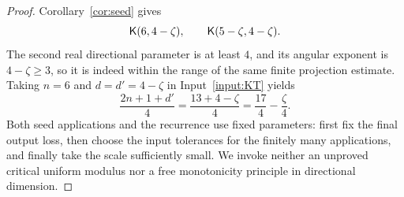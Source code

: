 \begin{proof}
Corollary~\ref{cor:seed} gives
\[
 \mathsf K(6,4-\zeta),\qquad \mathsf K(5-\zeta,4-\zeta).
\]
The second real directional parameter is at least $4$, and its angular exponent is $4-\zeta\ge3$,
so it is indeed within the range of the same finite projection estimate.
Taking $n=6$ and $d=d'=4-\zeta$ in Input~\ref{input:KT} yields
\[
 \frac{2n+1+d'}4=\frac{13+4-\zeta}{4}
                  =\frac{17}{4}-\frac\zeta4.
\]
Both seed applications and the recurrence use fixed parameters:
first fix the final output loss, then choose the input tolerances for the finitely many applications,
and finally take the scale sufficiently small.
We invoke neither an unproved critical uniform modulus nor a free monotonicity principle in directional dimension.
\end{proof}
